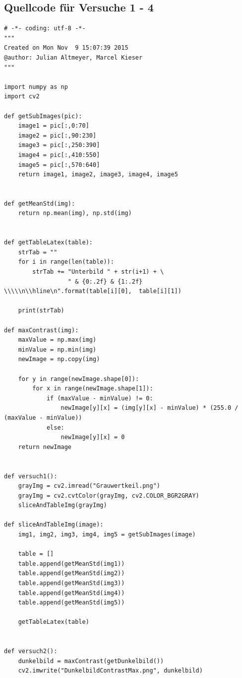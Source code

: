 \documentclass[12pt,oneside,a4paper]{report}
\begin{document}
\subsection{Quellcode für Versuche 1 - 4}
\label{chap:APPENDIX_SOURCECODE_V1}
\begin{lstlisting}[style=PYTHON, frame=single, caption=QuellCodeV1 bis V4, captionpos=b, label=lst:CodeV2]
# -*- coding: utf-8 -*-
"""
Created on Mon Nov  9 15:07:39 2015
@author: Julian Altmeyer, Marcel Kieser
"""

import numpy as np
import cv2

def getSubImages(pic):
    image1 = pic[:,0:70]
    image2 = pic[:,90:230]
    image3 = pic[:,250:390]
    image4 = pic[:,410:550]
    image5 = pic[:,570:640]
    return image1, image2, image3, image4, image5


def getMeanStd(img):
    return np.mean(img), np.std(img)


def getTableLatex(table):
    strTab = ""
    for i in range(len(table)):
        strTab += "Unterbild " + str(i+1) + \
                  " & {0:.2f} & {1:.2f} \\\\\n\\hline\n".format(table[i][0],  table[i][1])

    print(strTab)

def maxContrast(img):
    maxValue = np.max(img)
    minValue = np.min(img)
    newImage = np.copy(img)
    
    for y in range(newImage.shape[0]):
        for x in range(newImage.shape[1]):
            if (maxValue - minValue) != 0:
                newImage[y][x] = (img[y][x] - minValue) * (255.0 / (maxValue - minValue))
            else:
                newImage[y][x] = 0
    return newImage


def versuch1():
    grayImg = cv2.imread("Grauwertkeil.png")    
    grayImg = cv2.cvtColor(grayImg, cv2.COLOR_BGR2GRAY)
    sliceAndTableImg(grayImg)

def sliceAndTableImg(image):    
    img1, img2, img3, img4, img5 = getSubImages(image)
    
    table = []
    table.append(getMeanStd(img1))
    table.append(getMeanStd(img2))
    table.append(getMeanStd(img3))
    table.append(getMeanStd(img4))
    table.append(getMeanStd(img5))
    
    getTableLatex(table)


def versuch2():
    dunkelbild = maxContrast(getDunkelbild())
    cv2.imwrite("DunkelbildContrastMax.png", dunkelbild)


\end{lstlisting}
\end{document}
